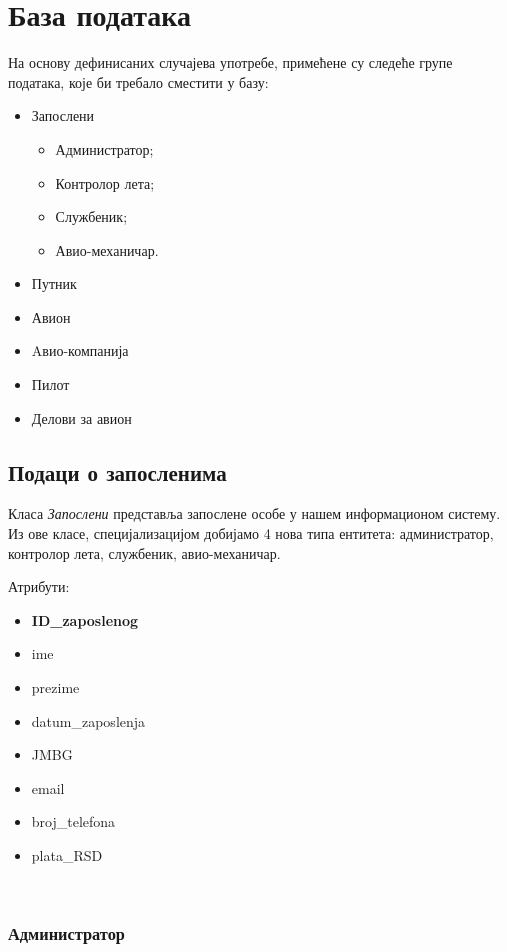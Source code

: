 \documentclass{article}
\begin{document}
\section{База података}
На основу дефинисаних случајева употребе, примећене су следеће групе података, које би требало 
сместити у базу:

\begin{itemize}
    \item Запослени
        \begin{itemize}
            \item Администратор;
            \item Контролор лета;
            \item Службеник;
            \item Авио-механичар.
        \end{itemize}
    \item Путник
    \item Авион
    \item Aвио-компанија
    \item Пилот
    \item Делови за авион
\end{itemize}

\subsection{Подаци о запосленима}

Класа \textit{Запослени} представља запослене особе у нашем информационом систему. Из ове класе, специјализацијом добијамо 4 нова типа ентитета: администратор, контролор лета, службеник, авио-механичар.

\vspace{20}
\hspace{-18}
Атрибути:
\begin{itemize}
    \item \textbf{ID\_zaposlenog}
    \item ime
    \item prezime
    \item datum\_zaposlenja
    \item JMBG
    \item email
    \item broj\_telefona
    \item plata\_RSD
\end{itemize}

\\
\vspace{20}
\subsubsection{
\textbf{\large Администратор}}
\vspace{0.3cm}
\end{document}
